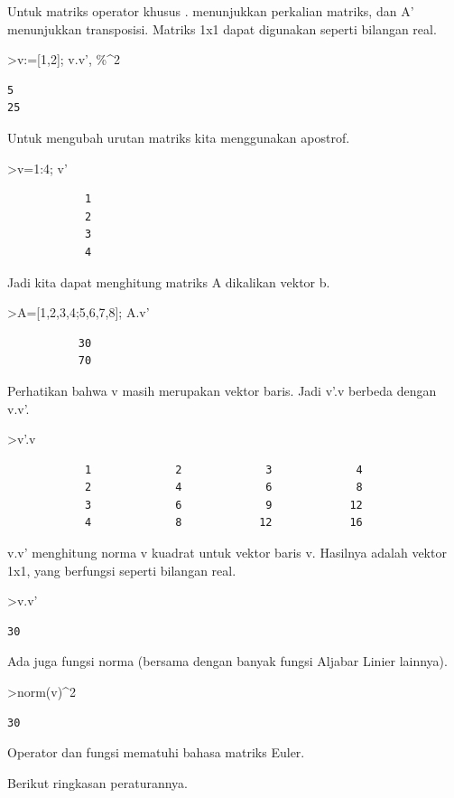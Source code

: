 \documentclass[
]{book}
\begin{document}
Untuk matriks operator khusus . menunjukkan perkalian matriks, dan A' menunjukkan transposisi. Matriks 1x1 dapat digunakan seperti bilangan real.

\textgreater v:={[}1,2{]}; v.v', \%\^{}2

\begin{verbatim}
5
25
\end{verbatim}

Untuk mengubah urutan matriks kita menggunakan apostrof.

\textgreater v=1:4; v'

\begin{verbatim}
            1 
            2 
            3 
            4 
\end{verbatim}

Jadi kita dapat menghitung matriks A dikalikan vektor b.

\textgreater A={[}1,2,3,4;5,6,7,8{]}; A.v'

\begin{verbatim}
           30 
           70 
\end{verbatim}

Perhatikan bahwa v masih merupakan vektor baris. Jadi v'.v berbeda dengan v.v'.

\textgreater v'.v

\begin{verbatim}
            1             2             3             4 
            2             4             6             8 
            3             6             9            12 
            4             8            12            16 
\end{verbatim}

v.v' menghitung norma v kuadrat untuk vektor baris v. Hasilnya adalah vektor 1x1, yang berfungsi seperti bilangan real.

\textgreater v.v'

\begin{verbatim}
30
\end{verbatim}

Ada juga fungsi norma (bersama dengan banyak fungsi Aljabar Linier lainnya).

\textgreater norm(v)\^{}2

\begin{verbatim}
30
\end{verbatim}

Operator dan fungsi mematuhi bahasa matriks Euler.

Berikut ringkasan peraturannya.
\end{document}
